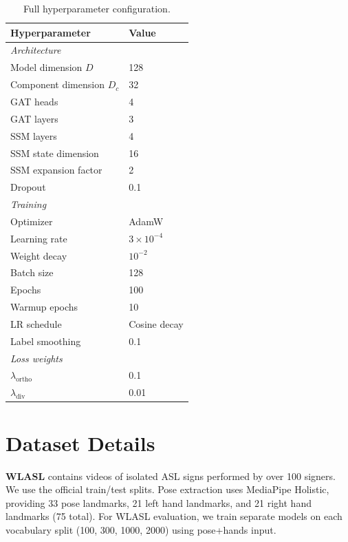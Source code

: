 \documentclass{article}
\theoremstyle{definition}
\theoremstyle{remark}
\begin{document}
\begin{table}[ht]
\caption{Full hyperparameter configuration.}
\label{tab:hyperparams}
\vspace{-1mm}
\begin{center}
\begin{small}
\begin{tabular*}{\columnwidth}{@{\extracolsep{\fill}}ll@{}}
\toprule
Hyperparameter & Value \\
\midrule
\multicolumn{2}{l}{\textit{Architecture}} \\
Model dimension $D$ & 128 \\
Component dimension $D_c$ & 32 \\
GAT heads & 4 \\
GAT layers & 3 \\
SSM layers & 4 \\
SSM state dimension & 16 \\
SSM expansion factor & 2 \\
Dropout & 0.1 \\
\midrule
\multicolumn{2}{l}{\textit{Training}} \\
Optimizer & AdamW \\
Learning rate & $3 \times 10^{-4}$ \\
Weight decay & $10^{-2}$ \\
Batch size & 128 \\
Epochs & 100 \\
Warmup epochs & 10 \\
LR schedule & Cosine decay \\
Label smoothing & 0.1 \\
\midrule
\multicolumn{2}{l}{\textit{Loss weights}} \\
$\lambda_{\text{ortho}}$ & 0.1 \\
$\lambda_{\text{div}}$ & 0.01 \\
\bottomrule
\end{tabular*}
\end{small}
\end{center}
\vspace{-2mm}
\end{table}

\section{Dataset Details}
\label{app:datasets}

\textbf{WLASL} \citep{li2020word} contains videos of isolated ASL signs performed by over 100 signers. We use the official train/test splits. Pose extraction uses MediaPipe Holistic, providing 33 pose landmarks, 21 left hand landmarks, and 21 right hand landmarks (75 total). For WLASL evaluation, we train separate models on each vocabulary split (100, 300, 1000, 2000) using pose+hands input.
\end{document}
